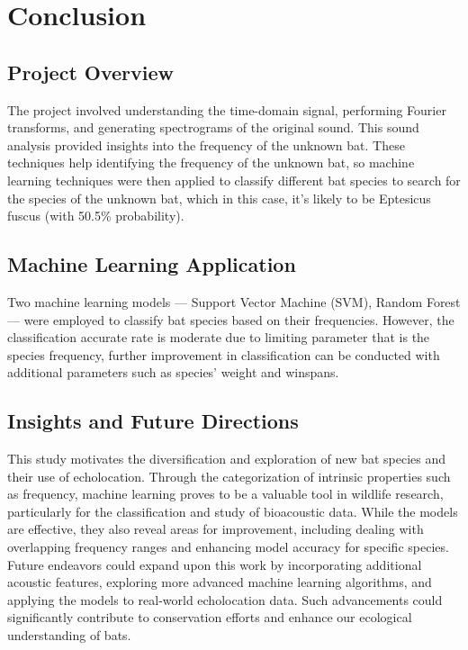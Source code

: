 \documentclass[12pt]{article}
\begin{document}
\section{Conclusion}

\subsection{Project Overview}
The project involved understanding the time-domain signal, performing Fourier transforms, and generating spectrograms of the original sound. This sound analysis provided insights into the frequency of the unknown bat. These techniques help identifying the frequency of the unknown bat, so machine learning techniques were then applied to classify different bat species to search for the species of the unknown bat, which in this case, it's likely to be Eptesicus fuscus (with 50.5\% probability).
\subsection{Machine Learning Application}
Two machine learning models — Support Vector Machine (SVM), Random Forest — were employed to classify bat species based on their frequencies. However, the classification accurate rate is moderate due to limiting parameter that is the species frequency, further improvement in classification can be conducted with additional parameters such as species' weight and winspans.
\subsection{Insights and Future Directions}
This study motivates the diversification and exploration of new bat species and their use of echolocation. Through the categorization of intrinsic properties such as frequency, machine learning proves to be a valuable tool in wildlife research, particularly for the classification and study of bioacoustic data. While the models are effective, they also reveal areas for improvement, including dealing with overlapping frequency ranges and enhancing model accuracy for specific species. Future endeavors could expand upon this work by incorporating additional acoustic features, exploring more advanced machine learning algorithms, and applying the models to real-world echolocation data. Such advancements could significantly contribute to conservation efforts and enhance our ecological understanding of bats.
\end{document}
